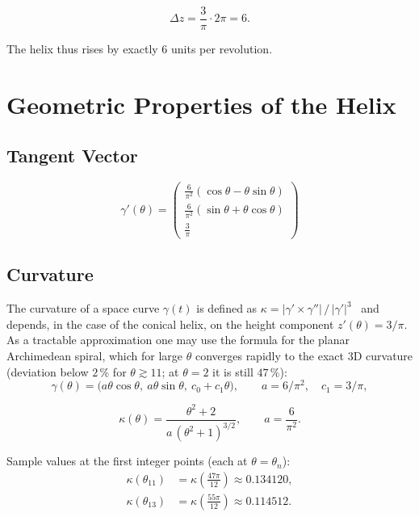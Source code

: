 \begin{equation}
\Delta z = \frac{3}{\pi} \cdot 2\pi = 6.
\end{equation}

The helix thus rises by exactly 6 units per revolution.

\section{Geometric Properties of the Helix}

\subsection{Tangent Vector}

\begin{equation}
\gamma'(\theta) =
\begin{pmatrix}
\frac{6}{\pi^2}(\cos\theta - \theta\sin\theta) \\[8pt]
\frac{6}{\pi^2}(\sin\theta + \theta\cos\theta) \\[8pt]
\frac{3}{\pi}
\end{pmatrix}
\end{equation}

\subsection{Curvature}

\begin{remark}\label{rem:planar-curvature-approx}
The curvature of a space curve $\gamma(t)$ is defined as
$\kappa = |\gamma' \times \gamma''| \, / \, |\gamma'|^3$~\cite{doCarmo1976,Struik1988}
and depends, in the case of the conical helix, on the height component
$z'(\theta) = 3/\pi$. As a tractable approximation one may use the formula
for the planar Archimedean spiral, which for large $\theta$ converges
rapidly to the exact 3D curvature (deviation below $2\,\%$ for $\theta \gtrsim 11$; at $\theta = 2$ it is still $47\,\%$):
\[
  \gamma(\theta) = \bigl(a\theta\cos\theta,\ a\theta\sin\theta,\
  c_0 + c_1\theta\bigr),
  \qquad a = 6/\pi^2, \quad c_1 = 3/\pi,
\]
\end{remark}

\begin{equation}
\kappa(\theta)
= \frac{\theta^2 + 2}{a\,(\theta^2 + 1)^{3/2}},
\qquad
a = \frac{6}{\pi^2}.
\end{equation}

Sample values at the first integer points (each at $\theta = \theta_n$):
\begin{align}
\kappa(\theta_{11}) &= \kappa\!\left(\tfrac{47\pi}{12}\right) \approx 0.134120, \\
\kappa(\theta_{13}) &= \kappa\!\left(\tfrac{55\pi}{12}\right) \approx 0.114512.
\end{align}

